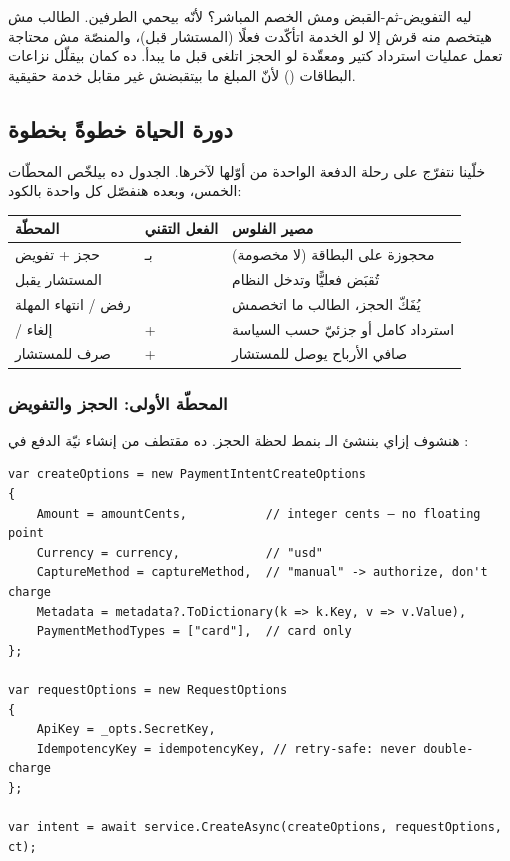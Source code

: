 \begin{why}
ليه التفويض-ثم-القبض ومش الخصم المباشر؟ لأنّه بيحمي الطرفين. الطالب مش هيتخصم منه
قرش إلا لو الخدمة اتأكّدت فعلًا (المستشار قبل)، والمنصّة مش محتاجة تعمل عمليات
استرداد كتير ومعقّدة لو الحجز اتلغى قبل ما يبدأ. ده كمان بيقلّل نزاعات البطاقات
() لأنّ المبلغ ما بيتقبضش غير مقابل خدمة حقيقية.
\end{why}

\subsection{دورة الحياة خطوةً بخطوة}

خلّينا نتفرّج على رحلة الدفعة الواحدة من أوّلها لآخرها. الجدول ده بيلخّص المحطّات
الخمس، وبعده هنفصّل كل واحدة بالكود:

\begin{center}
\begin{tabular}{L{3.6cm} L{4.2cm} L{5.2cm}}
\toprule
\textbf{\color{spPrimary}المحطّة} & \textbf{\color{spPrimary}الفعل التقني} & \textbf{\color{spPrimary}مصير الفلوس} \\
\midrule
حجز + تفويض &  بـ  & محجوزة على البطاقة (لا مخصومة) \\
المستشار يقبل &  & تُقبَض فعليًّا وتدخل النظام \\
رفض / انتهاء المهلة &  & يُفَكّ الحجز، الطالب ما اتخصمش \\
 / إلغاء &  +  & استرداد كامل أو جزئيّ حسب السياسة \\
صرف للمستشار &  +  & صافي الأرباح يوصل للمستشار \\
\bottomrule
\end{tabular}
\end{center}

\subsubsection{المحطّة الأولى: الحجز والتفويض}

هنشوف إزاي بننشئ الـ  بنمط  لحظة الحجز.
ده مقتطف من إنشاء نيّة الدفع في :

\begin{english}
\begin{lstlisting}[language={[Sharp]C}]
var createOptions = new PaymentIntentCreateOptions
{
    Amount = amountCents,           // integer cents — no floating point
    Currency = currency,            // "usd"
    CaptureMethod = captureMethod,  // "manual" -> authorize, don't charge
    Metadata = metadata?.ToDictionary(k => k.Key, v => v.Value),
    PaymentMethodTypes = ["card"],  // card only
};

var requestOptions = new RequestOptions
{
    ApiKey = _opts.SecretKey,
    IdempotencyKey = idempotencyKey, // retry-safe: never double-charge
};

var intent = await service.CreateAsync(createOptions, requestOptions, ct);
\end{lstlisting}
\end{english}

